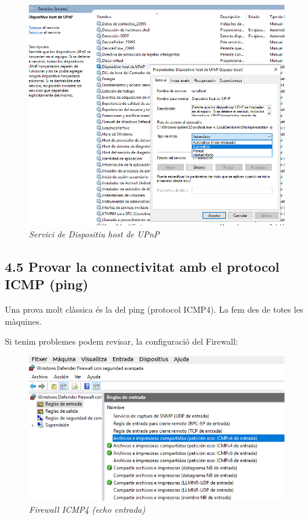 \documentclass[
  a4paper,
]{article}
\begin{document}
\begin{figure}
\centering
\includegraphics{png/ADDS/ServicioDispositivoUPnP.png}
\caption{\emph{Servici de Dispositiu host de UPnP}}
\end{figure}

\subsection{4.5 Provar la connectivitat amb el protocol ICMP
(ping)}\label{provar-la-connectivitat-amb-el-protocol-icmp-ping}

Una prova molt clàssica és la del ping (protocol ICMP4). La fem des de
totes les màquines.

Si tenim problemes podem revisar, la configuració del Firewall:

\begin{figure}
\centering
\includegraphics{png/ADDS/FirewallICMP4Entrada.png}
\caption{\emph{Firewall ICMP4 (echo entrada)}}
\end{figure}
\end{document}
